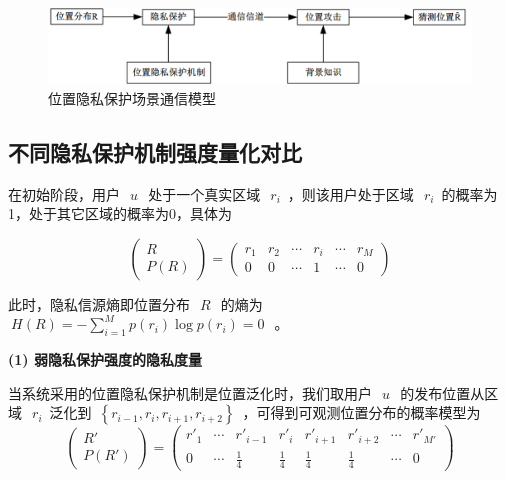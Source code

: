 \begin{figure}[htbp]
	\centering
	\includegraphics[width = 0.95\linewidth]{./figures/Communication-Model-for-Privacy-of-location.png}
	\caption{位置隐私保护场景通信模型}
	\label{fig:Communication-Model-for-Privacy-of-location}
\end{figure}

\subsection{不同隐私保护机制强度量化对比}\label{4.2}

在初始阶段，用户~$~u~$~处于一个真实区域~$~r_{i}$~，则该用户处于区域~$~r_{i}$~的概率为1，处于其它区域的概率为0，具体为

\begin{equation}
\begin{pmatrix}
R\\ 
P(R)
\end{pmatrix}=\begin{pmatrix}
r_{1} & r_{2} & \cdots  & r_{i} & \cdots  & r_{M}\\ 
0 & 0 & \cdots  & 1 & \cdots  & 0
\end{pmatrix}
\end{equation}

此时，隐私信源熵即位置分布~$~R~$~的熵为~$~H(R)=-\sum_{i=1}^{M}p(r_{i})\log p(r_{i})=0~$~。

\textbf{(1) 弱隐私保护强度的隐私度量}

当系统采用的位置隐私保护机制是位置泛化时，我们取用户~$~u~$~的发布位置从区域~$~r_{i}$~泛化到~$\left \{ r_{i-1},r_{i},r_{i+1},r_{i+2} \right \}$~，可得到可观测位置分布的概率模型为
\begin{equation}
\begin{pmatrix}
{R}'\\ 
P({R}')
\end{pmatrix}=\begin{pmatrix}
{r}'_{1} & \cdots  & {r}'_{i-1} & {r}'_{i} & {r}'_{i+1}  & {r}'_{i+2} & \cdots & {r}'_{{M}'} \\ 
0 & \cdots & \frac{1}{4} & \frac{1}{4} & \frac{1}{4}  & \frac{1}{4} & \cdots & 0
\end{pmatrix}
\end{equation}

